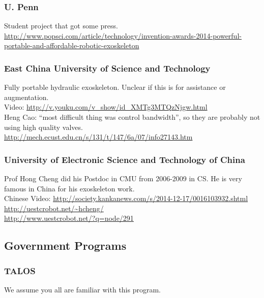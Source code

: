 \subsubsection{U. Penn}

\noindent
Student project that got some press.\\
\url{http://www.popsci.com/article/technology/invention-awards-2014-powerful-portable-and-affordable-robotic-exoskeleton}\\

\subsubsection{East China University of Science and Technology}

\noindent
Fully portable hydraulic exoskeleton. Unclear if this is for
assistance or augmentation.\\
Video: \url{http://v.youku.com/v_show/id_XMTg3MTQzNjgw.html}\\
Heng Cao: ``most difficult thing was control bandwidth'', so they
are probably not using high quality valves.
\url{http://mech.ecust.edu.cn/s/131/t/147/6a/07/info27143.htm}

\subsubsection{University of Electronic Science and Technology of China}

\noindent
Prof Hong Cheng did his Postdoc in CMU from 2006-2009 in CS.
He is very famous in China for his exoskeleton work.\\
Chinese Video: \url{http://society.kankanews.com/s/2014-12-17/0016103932.shtml}\\
\url{http://uestcrobot.net/~hcheng/}\\
\url{http://www.uestcrobot.net/?q=node/291}\\


\subsection{Government Programs}

\subsubsection{TALOS}

\noindent
We assume you all are familiar with this program.

